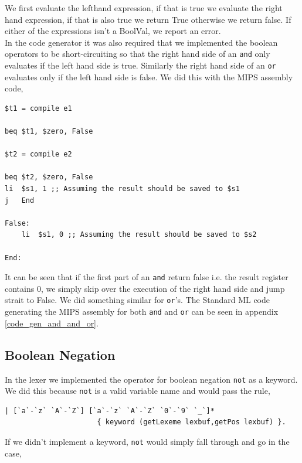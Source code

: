 \documentclass[11pt]{article}
\begin{document}
    We first evaluate the lefthand expression, if that is true we evaluate the
    right hand expression, if that is also true we return True otherwise we
    return false.  If either of the expressions isn't a BoolVal, we report an
    error. \\

    In the code generator it was also required that we implemented the boolean
    operators to be short-circuiting so that the right hand side of an
    \texttt{and} only evaluates if the left hand side is true.  Similarly the
    right hand side of an \texttt{or} evaluates only if the left hand side is
    false.  We did this with the MIPS assembly code,

    \begin{lstlisting}[basicstyle=\small]
$t1 = compile e1

beq $t1, $zero, False

$t2 = compile e2

beq $t2, $zero, False
li  $s1, 1 ;; Assuming the result should be saved to $s1
j   End

False:
    li  $s1, 0 ;; Assuming the result should be saved to $s2

End:
    \end{lstlisting}

    It can be seen that if the first part of an \texttt{and} return false i.e.
    the result register contains 0, we simply skip over the execution of the
    right hand side and jump strait to False.  We did something similar for
    \texttt{or}'s.  The Standard ML code generating the MIPS assembly for both
    \texttt{and} and \texttt{or} can be seen in appendix
    \ref{code_gen_and_and_or}.

    \subsection{Boolean Negation}
    In the lexer we implemented the operator for boolean negation \texttt{not}
    as a keyword.  We did this because \texttt{not} is a valid variable name and
    would pass the rule,

    \begin{lstlisting}[basicstyle=\small]
| [`a`-`z` `A`-`Z`] [`a`-`z` `A`-`Z` `0`-`9` `_`]*
                      { keyword (getLexeme lexbuf,getPos lexbuf) }.
    \end{lstlisting}

    If we didn't implement a keyword, \texttt{not} would simply fall through and
    go in the case,
\end{document}
